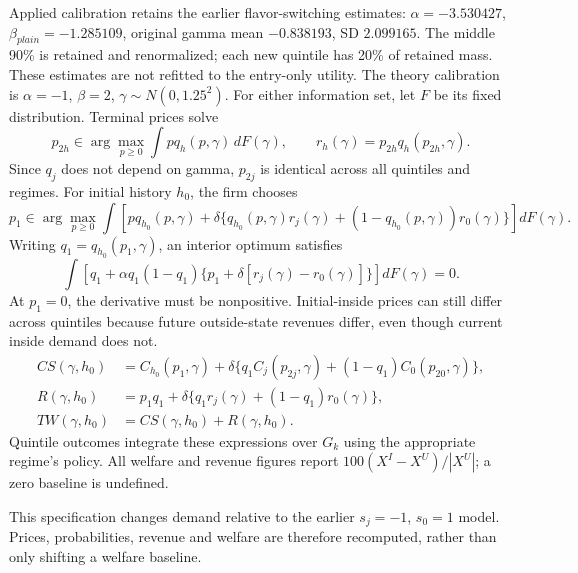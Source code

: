 Applied calibration retains the earlier flavor-switching estimates:
$\alpha=-3.530427$, $\beta_{plain}=-1.285109$, original gamma mean $-0.838193$,
SD $2.099165$. The middle 90\% is retained and renormalized; each new quintile has
20\% of retained mass. These estimates are not refitted to the entry-only utility.
The theory calibration is $\alpha=-1$, $\beta=2$, $\gamma\sim N(0,1.25^2)$.
\newpage
{}
For either information set, let $F$ be its fixed distribution. Terminal prices solve
\[
p_{2h}\in\arg\max_{p\geq0}\int p q_h(p,\gamma)\,dF(\gamma),\qquad
r_h(\gamma)=p_{2h}q_h(p_{2h},\gamma).
\]
Since $q_j$ does not depend on gamma, $p_{2j}$ is identical across all quintiles and regimes.
For initial history $h_0$, the firm chooses
\[
p_1\in\arg\max_{p\geq0}\int\left[pq_{h_0}(p,\gamma)
+\delta\{q_{h_0}(p,\gamma)r_j(\gamma)
+(1-q_{h_0}(p,\gamma))r_0(\gamma)\}\right]dF(\gamma).
\]
Writing $q_1=q_{h_0}(p_1,\gamma)$, an interior optimum satisfies
\[
\int\left[q_1+\alpha q_1(1-q_1)
\{p_1+\delta[r_j(\gamma)-r_0(\gamma)]\}\right]dF(\gamma)=0.
\]
At $p_1=0$, the derivative must be nonpositive. Initial-inside prices can still differ
across quintiles because future outside-state revenues differ, even though current inside demand does not.
\begin{align*}
CS(\gamma,h_0)&=C_{h_0}(p_1,\gamma)+\delta\{q_1 C_j(p_{2j},\gamma)+(1-q_1)C_0(p_{20},\gamma)\},\\
R(\gamma,h_0)&=p_1q_1+\delta\{q_1r_j(\gamma)+(1-q_1)r_0(\gamma)\},\\
TW(\gamma,h_0)&=CS(\gamma,h_0)+R(\gamma,h_0).
\end{align*}
Quintile outcomes integrate these expressions over $G_k$ using the appropriate regime's policy.
All welfare and revenue figures report $100(X^{I}-X^{U})/|X^{U}|$; a zero baseline is undefined.

This specification changes demand relative to the earlier $s_j=-1$, $s_0=1$ model.
Prices, probabilities, revenue and welfare are therefore recomputed, rather than only shifting a welfare baseline.

